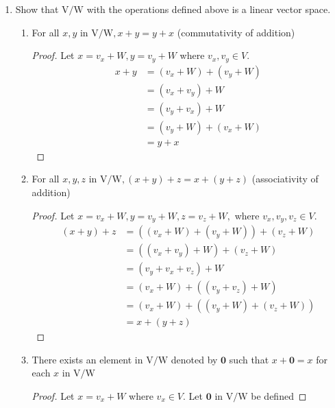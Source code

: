 \documentclass[11pt]{scrartcl}
\begin{document}
\begin{enumerate}[label=\alph*.]
	\item{
	      Show that \(\mathrm{V}/\mathrm{W}\) with the operations defined above is a linear vector space.
	      \begin{enumerate}[label=VS \arabic*:]
		      \item{
		            For all $x, y$ in $\mathrm{V}/\mathrm{W}, x+y=y+x$ (commutativity of addition)
		            \begin{proof}
			            Let $x = v_x + W, y = v_y + W$ where $v_x,v_y \in V$.
			            \begin{align*}
				            x + y & = (v_x + W) + (v_y + W) \\
				                  & = (v_x + v_y) + W       \\
				                  & = (v_y + v_x) + W       \\
				                  & = (v_y + W) + (v_x + W) \\
				                  & = y + x
			            \end{align*}
		            \end{proof}
		            }
		      \item{
		            For all $x, y, z$ in $\mathrm{V}/\mathrm{W},(x+y)+z=x+(y+z)$ (associativity of addition)
		            \begin{proof}
			            Let $x = v_x + W, y = v_y + W, z = v_z + W,$ where $v_x,v_y,v_z \in V$.
			            \begin{align*}
				            (x + y) + z & = ((v_x + W) + (v_y + W)) + (v_z + W) \\
				                        & = ((v_x + v_y) + W) + (v_z + W)       \\
				                        & = (v_y + v_x + v_z) + W               \\
				                        & = (v_x + W) + ((v_y + v_z) + W)       \\
				                        & = (v_x + W) + ((v_y + W) + (v_z + W)) \\
				                        & = x + (y + z)
			            \end{align*}
		            \end{proof}
		            }
		      \item{
		            There exists an element in $\mathrm{V}/\mathrm{W}$ denoted by $\mathbf{0}$ such that $x+\mathbf{0}=x$ for each $x$ in $\mathrm{V}/\mathrm{W}$
		            \begin{proof}
			            Let $x = v_x + W$ where $v_x \in V$. Let $\mathbf{0}$ in $\mathrm{V}/\mathrm{W}$ be defined

\end{proof}}
\end{enumerate}}
\end{enumerate}
\end{document}
